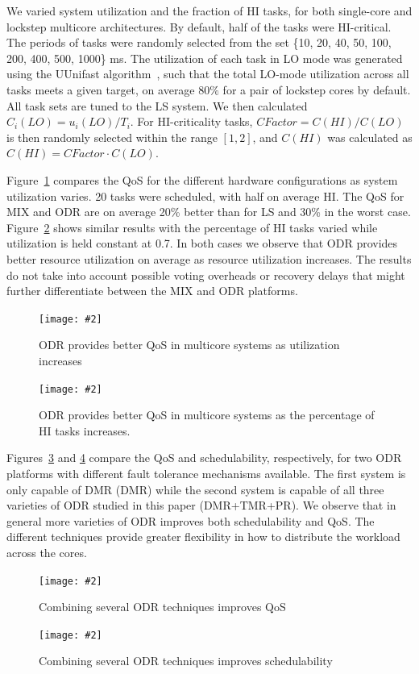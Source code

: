 \documentclass[conference]{IEEEtran}
\newcommand{\addfigure}[4]{
\begin{figure}[fh]
	\centering
	\texttt{[image: \#2]}
	\caption{#3}
	\label{#4}
\end{figure}
}
\begin{document}
	We varied system utilization and the fraction of HI tasks, for both single-core and lockstep multicore architectures.
	By default, half of the tasks were HI-critical. The periods of tasks were randomly selected from the set \{10, 20, 40, 50, 100, 200, 400, 500, 1000\} ms.
	The utilization of each task in LO mode was generated using the UUnifast algorithm~\cite{bini2005measuring}, such that the total LO-mode utilization across all tasks meets a given target, on average $80\%$ for a pair of lockstep cores by default. All task sets are tuned to the LS system. 
	We then calculated $C_i(LO) =  u_i(LO)/T_i$. 
	For HI-criticality tasks, $CFactor=C(HI)/C(LO)$ is then randomly selected within the range $[1, 2]$, and $C(HI)$ was calculated as $C(HI)=CFactor \cdot C(LO)$.
	
	Figure~\ref{f:platform-qos} compares the QoS for the different hardware configurations as system utilization varies. 20 tasks were scheduled, with half on average HI. The QoS for MIX and ODR are on average 20\% better than for LS and 30\% in the worst case. Figure~\ref{f:mc-hitasks} shows similar results with the percentage of HI tasks varied while utilization is held constant at 0.7. In both cases we observe that ODR provides better resource utilization on average as resource utilization increases. The results do not take into account possible voting overheads or recovery delays that might further differentiate between the MIX and ODR platforms. 

	\addfigure{0}{platform-qos.png}{ODR provides better QoS in multicore systems as utilization increases}{f:platform-qos}
	\addfigure{0}{hitask.png}{ODR provides better QoS in multicore systems as the percentage of HI tasks increases.}{f:mc-hitasks}
	
	Figures~\ref{f:mc-mec-qos-hi} and \ref{f:mc-mec-sched} compare the QoS and schedulability, respectively, for two ODR platforms with different fault tolerance mechanisms available. The first system is only capable of DMR (DMR) while the second system is capable of all three varieties of ODR studied in this paper (DMR+TMR+PR). We observe that in general more varieties of ODR improves both schedulability and QoS. The different techniques provide greater flexibility in how to distribute the workload across the cores. 
	
	\addfigure{0}{mec-qos.png}{Combining several ODR techniques improves QoS}{f:mc-mec-qos-hi}
	\addfigure{0}{mec-sched.png}{Combining several ODR techniques improves schedulability}{f:mc-mec-sched}
	
\end{document}

